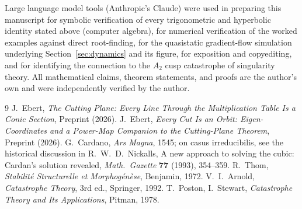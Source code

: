 \documentclass[11pt]{amsart}
\theoremstyle{remark}
\begin{document}
Large language model tools (Anthropic's Claude) were used in preparing this manuscript for symbolic verification of every trigonometric and hyperbolic identity stated above (computer algebra), for numerical verification of the worked examples against direct root-finding, for the quasistatic gradient-flow simulation underlying Section~\ref{sec:dynamics} and its figure, for exposition and copyediting, and for identifying the connection to the $A_2$ cusp catastrophe of singularity theory. All mathematical claims, theorem statements, and proofs are the author's own and were independently verified by the author.

\begin{thebibliography}{9}
 J.~Ebert, \emph{The Cutting Plane: Every Line Through the Multiplication Table Is a Conic Section}, Preprint (2026).
 J.~Ebert, \emph{Every Cut Is an Orbit: Eigen-Coordinates and a Power-Map Companion to the Cutting-Plane Theorem}, Preprint (2026).
 G.~Cardano, \emph{Ars Magna}, 1545; on casus irreducibilis, see the historical discussion in R.~W.~D.~Nickalls, A new approach to solving the cubic: Cardan's solution revealed, \emph{Math.\ Gazette} \textbf{77} (1993), 354--359.
 R.~Thom, \emph{Stabilit\'e Structurelle et Morphog\'en\`ese}, Benjamin, 1972.
 V.~I.~Arnold, \emph{Catastrophe Theory}, 3rd ed., Springer, 1992.
 T.~Poston, I.~Stewart, \emph{Catastrophe Theory and Its Applications}, Pitman, 1978.
\end{thebibliography}
\end{document}
